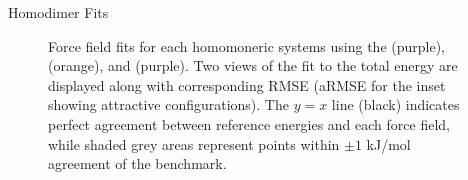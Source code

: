 \begin{section}{Homodimer Fits}
\begin{figure}
\begin{subfigure}{\textwidth}
    \end{subfigure}
    \caption{
    Force field fits for each homomoneric systems using the \isoff (purple),
\isaff (orange), and \mastiff (purple). 
    Two views of the fit to the total energy are displayed along with
    corresponding RMSE (aRMSE for the inset showing attractive configurations). 
    The $y=x$ line (black) indicates perfect agreement between reference energies
    and each force field, while shaded grey areas represent points within $\pm
    1$ kJ/mol agreement of the benchmark. 
     }
    \label{fig:all-scatter}
    \end{figure}

\end{section}
\clearpage

